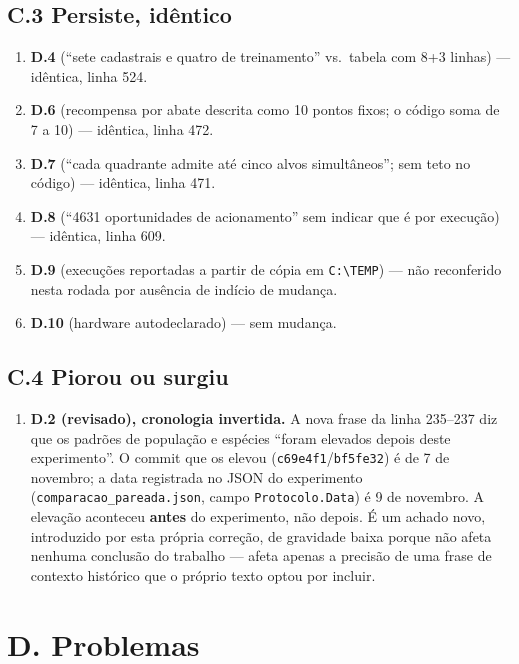 \documentclass[11pt,a4paper]{article}
\begin{document}
\subsection*{C.3 Persiste, idêntico}

\begin{enumerate}
  \item \textbf{D.4} (``sete cadastrais e quatro de treinamento'' vs.\ tabela com 8+3 linhas) ---
  idêntica, linha 524.
  \item \textbf{D.6} (recompensa por abate descrita como 10 pontos fixos; o código soma de 7 a 10) ---
  idêntica, linha 472.
  \item \textbf{D.7} (``cada quadrante admite até cinco alvos simultâneos''; sem teto no código) ---
  idêntica, linha 471.
  \item \textbf{D.8} (``4631 oportunidades de acionamento'' sem indicar que é por execução) ---
  idêntica, linha 609.
  \item \textbf{D.9} (execuções reportadas a partir de cópia em \texttt{C:\textbackslash TEMP}) --- não
  reconferido nesta rodada por ausência de indício de mudança.
  \item \textbf{D.10} (hardware autodeclarado) --- sem mudança.
\end{enumerate}

\subsection*{C.4 Piorou ou surgiu}

\begin{enumerate}
  \item \textbf{D.2 (revisado), cronologia invertida.} A nova frase da linha 235--237 diz que os
  padrões de população e espécies ``foram elevados depois deste experimento''. O commit que os elevou
  (\texttt{c69e4f1}/\texttt{bf5fe32}) é de 7 de novembro; a data registrada no JSON do experimento
  (\texttt{comparacao\_pareada.json}, campo \texttt{Protocolo.Data}) é 9 de novembro. A elevação
  aconteceu \textbf{antes} do experimento, não depois. É um achado novo, introduzido por esta própria
  correção, de gravidade baixa porque não afeta nenhuma conclusão do trabalho --- afeta apenas a
  precisão de uma frase de contexto histórico que o próprio texto optou por incluir.
\end{enumerate}

\section*{D. Problemas}
\end{document}
